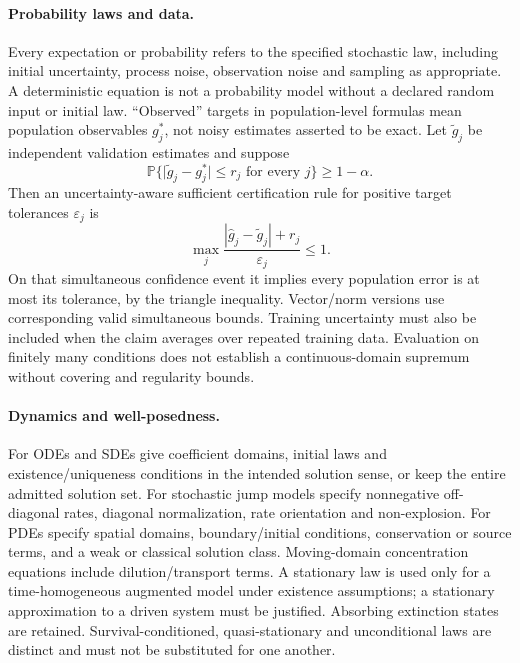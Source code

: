 \documentclass[11pt]{article}
\begin{document}
\paragraph{Probability laws and data.}
Every expectation or probability refers to the specified stochastic law, including initial uncertainty, process noise, observation noise and sampling as appropriate. A deterministic equation is not a probability model without a declared random input or initial law. ``Observed'' targets in population-level formulas mean population observables $g_j^*$, not noisy estimates asserted to be exact. Let $\widetilde g_j$ be independent validation estimates and suppose
\[
\mathbb{P}\{\lvert\widetilde g_j-g_j^*\rvert\le r_j\text{ for every }j\}\ge1-\alpha.
\]
Then an uncertainty-aware sufficient certification rule for positive target tolerances $\varepsilon_j$ is
\[
\max_j\frac{|\widehat g_j-\widetilde g_j|+r_j}{\varepsilon_j}\le1.
\]
On that simultaneous confidence event it implies every population error is at most its tolerance, by the triangle inequality. Vector/norm versions use corresponding valid simultaneous bounds. Training uncertainty must also be included when the claim averages over repeated training data. Evaluation on finitely many conditions does not establish a continuous-domain supremum without covering and regularity bounds.

\paragraph{Dynamics and well-posedness.}
For ODEs and SDEs give coefficient domains, initial laws and existence/uniqueness conditions in the intended solution sense, or keep the entire admitted solution set. For stochastic jump models specify nonnegative off-diagonal rates, diagonal normalization, rate orientation and non-explosion. For PDEs specify spatial domains, boundary/initial conditions, conservation or source terms, and a weak or classical solution class. Moving-domain concentration equations include dilution/transport terms. A stationary law is used only for a time-homogeneous augmented model under existence assumptions; a stationary approximation to a driven system must be justified. Absorbing extinction states are retained. Survival-conditioned, quasi-stationary and unconditional laws are distinct and must not be substituted for one another.
\end{document}
